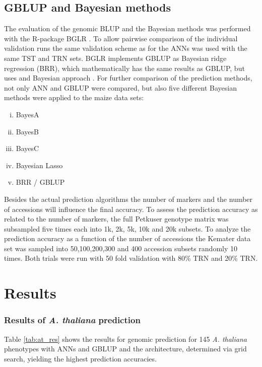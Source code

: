 \subsection{GBLUP and Bayesian methods} \label{met:blup:bayes}

The evaluation of the genomic BLUP and the Bayesian methods was performed with the
R-package BGLR \cite{BGLR}. To allow pairwise comparison of the individual validation runs
the same validation scheme as for the ANNs was used with the same TST and TRN sets. BGLR
implements GBLUP as Bayesian ridge regression (BRR), which mathematically has the same
results as GBLUP, but uses and Bayesian approach \cite{BGLR}. For further comparison of
the prediction methods, not only ANN and GBLUP were compared, but also five different
Bayesian methods were applied to the maize data sets:

\onehalfspacing
\begin{enumerate}[(i)]
\item BayesA
\item BayesB
\item BayesC
\item Bayesian Lasso
\item BRR / GBLUP
\end{enumerate}
\doublespacing

Besides the actual prediction algorithms the number of markers and the number of
accessions will influence the final accuracy. To assess the prediction accuracy as related
to the number of markers, the full Petkuser genotype matrix was subsampled five times each into 1k,
2k, 5k, 10k and 20k subsets. To analyze the prediction accuracy as a function of the
number of accessions the Kemater data set was sampled into 50,100,200,300 and 400
accession subsets  randomly 10 times. Both trials were run with 50 fold validation
with 80\% TRN and 20\% TRN. 



\section{Results} \label{res:gp}
\subsubsection{Results of \textit{A. thaliana} prediction} \label{res:gp:at}
Table \ref{tab:at_res} shows the results for genomic prediction for 145
\textit{A. thaliana} phenotypes with ANNs and GBLUP and the architecture, determined via
grid search, yielding the highest prediction accuracies.

